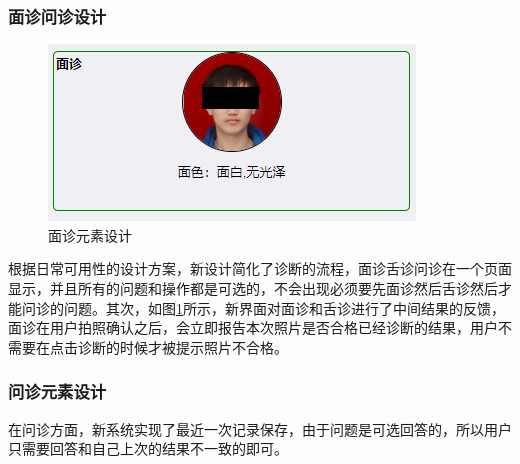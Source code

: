 \subsubsection{面诊问诊设计}

\begin{figure}[h]
    \centering
    \includegraphics[]{images/diag_design.png}
    \caption{面诊元素设计}
    \label{fig:diag_design}
\end{figure}

根据日常可用性的设计方案，新设计简化了诊断的流程，面诊舌诊问诊在一个页面显示，并且所有的问题和操作都是可选的，不会出现必须要先面诊然后舌诊然后才能问诊的问题。其次，如图\ref{fig:diag_design}所示，新界面对面诊和舌诊进行了中间结果的反馈，面诊在用户拍照确认之后，会立即报告本次照片是否合格已经诊断的结果，用户不需要在点击诊断的时候才被提示照片不合格。

\subsubsection{问诊元素设计}
在问诊方面，新系统实现了最近一次记录保存，由于问题是可选回答的，所以用户只需要回答和自己上次的结果不一致的即可。

